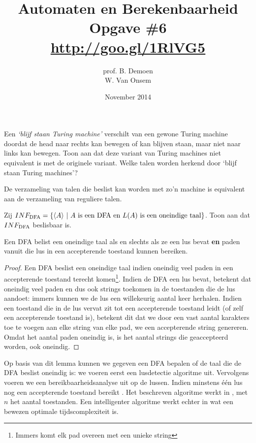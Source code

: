 \documentclass[a4paper]{article}
\title{Automaten en Berekenbaarheid\\Opgave \#6\\\url{http://goo.gl/1RlVG5}}
\author{prof. B. Demoen\\W. Van Onsem}
\date{November 2014}
\begin{document}
\maketitle

\begin{question}
Een \emph{`blijf staan Turing machine'} verschilt van een gewone Turing machine doordat de head naar rechts kan bewegen of kan blijven staan, maar niet naar links kan bewegen. Toon aan dat deze variant van Turing machines niet equivalent is met de originele variant. Welke talen worden herkend door `blijf staan Turing machines'?
\begin{answer}
De verzameling van talen die beslist kan worden met zo'n machine is equivalent aan de verzameling van reguliere talen. %
\end{answer}
\end{question}

\begin{question}
Zij $INF_{\rm DFA} = \{ \langle A \rangle \ | \ \text{$A$ is een DFA en $L(A)$ is een oneindige taal} \} $. Toon aan dat $INF_{\rm DFA}$ beslisbaar is.
\begin{answer}
\begin{lemma}
Een DFA belist een oneindige taal als en slechts als ze een lus bevat \textbf{en} paden vanuit die lus in een accepterende toestand kunnen bereiken.
\begin{proof}
Een DFA beslist een oneindige taal indien oneindig veel paden in een accepterende toestand terecht komen\footnote{Immers komt elk pad overeen met een unieke string}. Indien de DFA een lus bevat, betekent dat oneindig veel paden en dus ook strings toekomen in de toestanden die de lus aandoet: immers kunnen we de lus een willekeurig aantal keer herhalen. Indien een toestand die in de lus vervat zit tot een accepterende toestand leidt (of zelf een accepterende toestand is), betekent dit dat we door een vast aantal karakters toe te voegen aan elke string van elke pad, we een accepterende string genereren. Omdat het aantal paden oneindig is, is het aantal strings die geaccepteerd worden, ook oneindig.
\end{proof}
\end{lemma}
Op basis van dit lemma kunnen we gegeven een DFA bepalen of de taal die de DFA beslist oneindig is: we voeren eerst een lusdetectie algoritme uit. Vervolgens voeren we een bereikbaarheidsanalyse uit op de lussen. Indien minstens \'e\'en lus nog een accepterende toestand bereikt . Het beschreven algoritme werkt in , met $n$ het aantal toestanden. Een intelligenter algoritme werkt echter in  wat een bewezen optimale tijdscomplexiteit is.
\end{answer}

\end{question}
\end{document}
